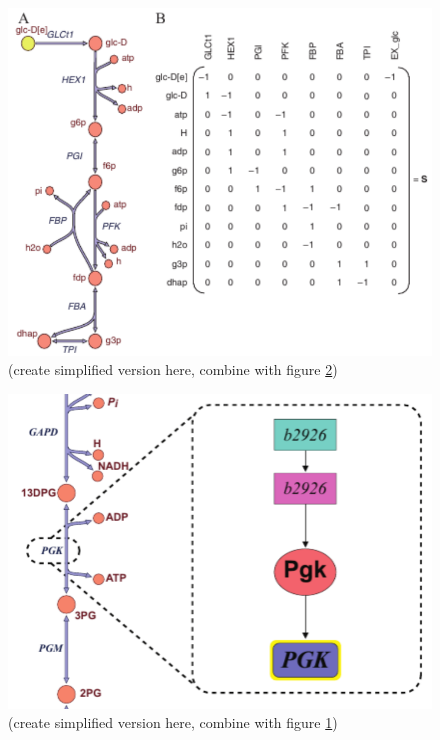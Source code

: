 \begin{figure}[!h]
\centering
\includegraphics[width=\linewidth]{figures/Selection_011.pdf}
\caption{(create simplified version here, combine with figure \ref{fig:reconstruction_GPR_example})}
\label{fig:reconstruction_to_matrix_example}
\end{figure}

\begin{figure}[!h]
\centering
\includegraphics[width=\linewidth]{figures/Selection_013.pdf}
\caption{(create simplified version here, combine with figure \ref{fig:reconstruction_to_matrix_example})}
\label{fig:reconstruction_GPR_example}
\end{figure}

